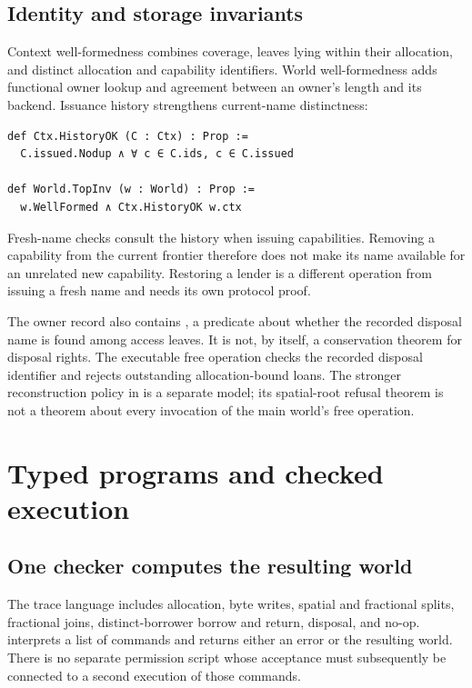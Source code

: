 \documentclass[a4paper,UKenglish,cleveref]{lipics-v2021}
\begin{document}
\subsection{Identity and storage invariants}

Context well-formedness combines coverage, leaves lying within their allocation,
and distinct allocation and capability identifiers. World well-formedness adds
functional owner lookup and agreement between an owner's length and its backend.
Issuance history strengthens current-name distinctness:
\begin{lstlisting}
def Ctx.HistoryOK (C : Ctx) : Prop :=
  C.issued.Nodup ∧ ∀ c ∈ C.ids, c ∈ C.issued

def World.TopInv (w : World) : Prop :=
  w.WellFormed ∧ Ctx.HistoryOK w.ctx
\end{lstlisting}
Fresh-name checks consult the history when issuing capabilities. Removing a
capability from the current frontier therefore does not make its name available
for an unrelated new capability. Restoring a lender is a different operation
from issuing a fresh name and needs its own protocol proof.

The owner record also contains , a predicate about whether
the recorded disposal name is found among access leaves. It is not, by itself,
a conservation theorem for disposal rights. The executable free operation checks
the recorded disposal identifier and rejects outstanding allocation-bound loans.
The stronger reconstruction policy in  is a separate
model; its spatial-root refusal theorem is not a theorem about every invocation
of the main world's free operation.

\section{Typed programs and checked execution}
\label{sec:execution}

\subsection{One checker computes the resulting world}

The trace language  includes allocation, byte writes, spatial and
fractional splits, fractional joins, distinct-borrower borrow and return,
disposal, and no-op.  interprets a list of commands and returns
either an error or the resulting world. There is no separate permission script
whose acceptance must subsequently be connected to a second execution of those
commands.
\end{document}
